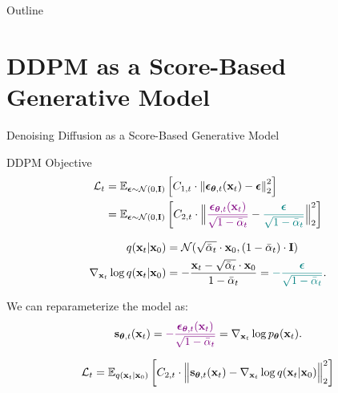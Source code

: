 \documentclass{beamer}
\renewcommand{\eqpause}{}
\renewcommand{\nextonslide}[1]{#1}
\begin{document}
\begin{frame}{Outline}
	\tableofcontents
\end{frame}
\section{DDPM as a Score-Based Generative Model}
\begin{frame}{Denoising Diffusion as a Score-Based Generative Model}
	\begin{block}{DDPM Objective}
		\vspace{-0.7cm}
		\begin{align*}
			\cL_t &= \bbE_{\bepsilon \sim \cN(0, \bI)} \left[ C_{1, t} \cdot \left\|  \bepsilon_{\btheta, t} (\bx_t) - \bepsilon\right\|_2^2  \right] \\
			\nextonslide{
			& = \bbE_{\bepsilon \sim \cN(0, \bI)} \left[ C_{2, t} \cdot \Bigl\| {\color{violet} \frac{\bepsilon_{\btheta, t}  (\bx_t) }{\sqrt{1 - \bar{\alpha}_t}}} - {\color{teal}\frac{\bepsilon}{\sqrt{1 - \bar{\alpha}_t}}}\Bigr\|_2^2  \right]
			}
		\end{align*}
		\vspace{-0.7cm}
	\end{block}
	\eqpause
	\vspace{-0.5cm}
	\begin{align*}
		q(\bx_t | \bx_0) &= \cN(\sqrt{\bar{\alpha}_t} \cdot \bx_0, (1 - \bar{\alpha}_t) \cdot \bI) \\
		\nextonslide{\nabla_{\bx_t} \log q(\bx_t | \bx_0) &= - \frac{\bx_t - \sqrt{\bar{\alpha}_t} \cdot \bx_0}{1 - \bar{\alpha}_t} = {\color{teal}-  \frac{\bepsilon}{\sqrt{1 - \bar{\alpha}_t}}}.}
	\end{align*}
	\eqpause
	We can reparameterize the model as: 
		\vspace{-0.2cm}
		\[
			\mathbf{s}_{\boldsymbol{\theta}, t}(\mathbf{x}_t) = {\color{violet}- \frac{\boldsymbol{\epsilon}_{\boldsymbol{\theta}, t}(\mathbf{x}_t)}{\sqrt{1 - \bar{\alpha}_t}}} = \nabla_{\mathbf{x}_t} \log p_{\boldsymbol{\theta}}(\mathbf{x}_t).
		\]
		\vspace{-0.3cm}
		\eqpause
		\[
			\mathcal{L}_t = \mathbb{E}_{q(\mathbf{x}_t | \mathbf{x}_0)} \left[ C_{2, t} \cdot \Bigl\|  \mathbf{s}_{\boldsymbol{\theta}, t} (\mathbf{x}_t) - \nabla_{\mathbf{x}_t} \log q(\mathbf{x}_t | \mathbf{x}_0) \Bigr\|_2^2  \right]
		\]
\end{frame}
\end{document}
